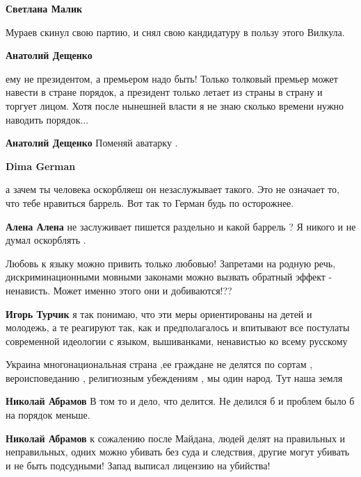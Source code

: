 \begin{itemize}
\begin{itemize}
\textbf{Светлана Малик} 

Мураев скинул свою партию, и снял свою кандидатуру в пользу этого Вилкула.

\textbf{Анатолий Дещенко} 

ему не президентом, а премьером надо быть! Только толковый премьер может
навести в стране порядок, а президент только летает из страны в страну и
торгует лицом. Хотя после нынешней власти я не знаю сколько времени нужно
наводить порядок...

\textbf{Анатолий Дещенко} Поменяй аватарку .

\textbf{Dima German} 

а зачем ты человека оскорбляеш он незаслужывает такого. Это не означает то, что
тебе нравиться баррель. Вот так то Герман будь по осторожнее.


\textbf{Алена Алена} не заслуживает пишется раздельно и какой баррель ? Я никого и не думал оскорблять .

\end{itemize} %


Любовь к языку можно привить только любовью!
Запретами на родную речь, дискриминационными мовными законами можно вызвать обратный эффект - ненависть.
Может именно этого они и добиваются!??

\begin{itemize} %
\textbf{Игорь Турчик} я так понимаю, что эти меры ориентированы на детей и молодежь, а те реагируют так, как и предполагалось и впитывают все постулаты современной идеологии с языком, вышиванками, ненавистью ко всему русскому
\end{itemize} %


Украина многонациональная страна ,ее граждане не делятся по сортам ,
вероисповеданию , религиозным убеждениям , мы один народ. Тут наша земля 

\begin{itemize} %
\textbf{Николай Абрамов} В том то и дело, что делится. Не делился б и проблем было б на порядок меньше.

\textbf{Николай Абрамов} к сожалению после Майдана, людей делят на правильных и неправильных, одних можно убивать без суда и следствия, другие могут убивать и не быть подсудными! Запад выписал лицензию на убийства!


\end{itemize}
\end{itemize}
